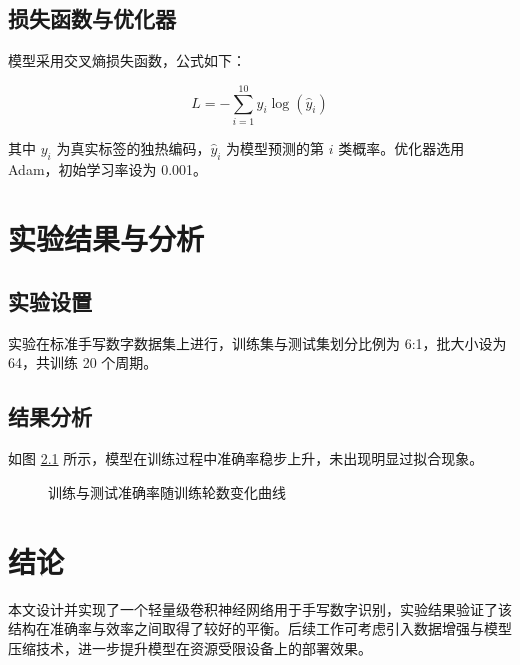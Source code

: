 \documentclass[report,oneside,UTF8,zihao=-4]{config}
\begin{document}
\section{损失函数与优化器}

模型采用交叉熵损失函数，公式如下：

\begin{equation}
    L = -\sum_{i=1}^{10} y_i \log(\hat{y}_i)
    \label{eq:crossentropy}
\end{equation}

其中 $y_i$ 为真实标签的独热编码，$\hat{y}_i$ 为模型预测的第 $i$ 类概率。优化器选用 Adam，初始学习率设为 0.001。

\chapter{实验结果与分析}

\section{实验设置}

实验在标准手写数字数据集上进行，训练集与测试集划分比例为 6:1，批大小设为 64，共训练 20 个周期。

\section{结果分析}

如图 \ref{fig:accuracy} 所示，模型在训练过程中准确率稳步上升，未出现明显过拟合现象。

\begin{figure}[h!]
    \centering
    \caption{训练与测试准确率随训练轮数变化曲线}
    \label{fig:accuracy}
\end{figure}

\chapter{结论}

本文设计并实现了一个轻量级卷积神经网络用于手写数字识别，实验结果验证了该结构在准确率与效率之间取得了较好的平衡。后续工作可考虑引入数据增强与模型压缩技术，进一步提升模型在资源受限设备上的部署效果。



\end{document}
